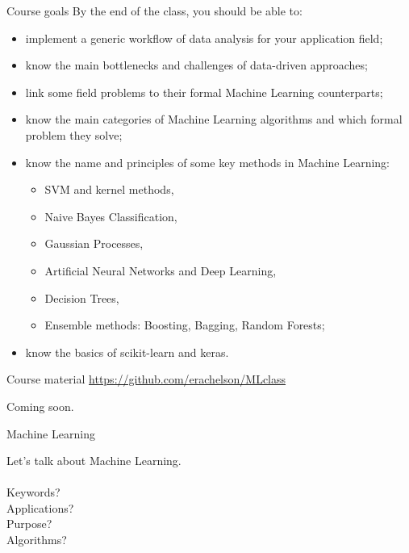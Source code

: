 \documentclass{beamer}
\begin{document}
\begin{frame}{Course goals}
\small
By the end of the class, you should be able to:
\begin{itemize}
\item implement a generic workflow of data analysis for your application field;
\item know the main bottlenecks and challenges of data-driven approaches;
\item link some field problems to their formal Machine Learning counterparts;
\item know the main categories of Machine Learning algorithms and which formal problem they solve;
\item know the name and principles of some key methods in Machine Learning:
\begin{itemize}
\item SVM and kernel methods,
\item Naive Bayes Classification,
\item Gaussian Processes,
\item Artificial Neural Networks and Deep Learning,
\item Decision Trees,
\item Ensemble methods: Boosting, Bagging, Random Forests;
\end{itemize} 
\item know the basics of scikit-learn and keras.
\end{itemize}
\end{frame}

\begin{frame}{Course material}
\small\url{https://github.com/erachelson/MLclass}

Coming soon.
\end{frame}

\begin{frame}{Machine Learning}
\begin{center}
Let's talk about Machine Learning.\\
~\\
Keywords?\\
Applications?\\
Purpose?\\
Algorithms?
\end{center}
\end{frame}
\end{document}
